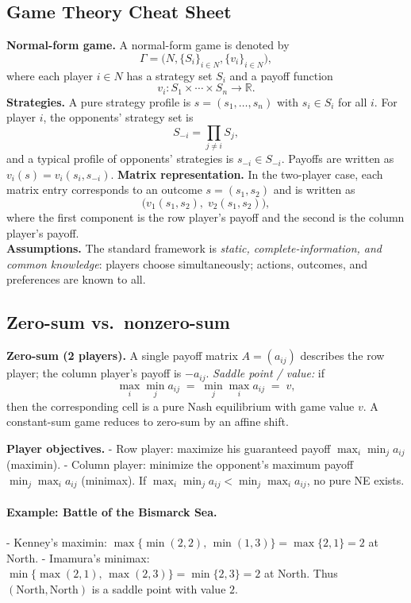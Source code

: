\documentclass[11pt]{article}
\newcommand{\Players}{N}
\begin{document}
\begin{multicols}{2}
\newpage
\section*{Game Theory Cheat Sheet}

\textbf{Normal-form game.} A normal-form game is denoted by
\[
\Gamma = \bigl(\Players, \{S_i\}_{i\in \Players}, \{v_i\}_{i\in \Players}\bigr),
\]
where each player $i\in\Players$ has a strategy set $S_i$ and a payoff function
\[
v_i : S_1 \times \cdots \times S_n \to \mathbb{R}.
\]
\textbf{Strategies.}  
A pure strategy profile is $s=(s_1,\dots,s_n)$ with $s_i \in S_i$ for all $i$.  
For player $i$, the opponents’ strategy set is
\[
S_{-i} = \prod_{j \neq i} S_j,
\]
and a typical profile of opponents’ strategies is $s_{-i}\in S_{-i}$.  
Payoffs are written as $v_i(s) = v_i(s_i,s_{-i})$.
\textbf{Matrix representation.}  
In the two-player case, each matrix entry corresponds to an outcome $s=(s_1,s_2)$ and is written as
\[
\bigl(v_1(s_1,s_2), \; v_2(s_1,s_2)\bigr),
\]
where the first component is the row player’s payoff and the second is the column player’s payoff.\\
\textbf{Assumptions.}  
The standard framework is \emph{static, complete-information, and common knowledge}: players choose simultaneously; actions, outcomes, and preferences are known to all.

\subsection*{Zero-sum vs.\ nonzero-sum}

\textbf{Zero-sum (2 players).}  
A single payoff matrix $A=(a_{ij})$ describes the row player; the column player’s payoff is $-a_{ij}$.  
\emph{Saddle point / value:} if
\[
\max_i \min_j a_{ij} \;=\; \min_j \max_i a_{ij} \;=\; v,
\]
then the corresponding cell is a pure Nash equilibrium with game value $v$.  
A constant-sum game reduces to zero-sum by an affine shift.

\textbf{Player objectives.}  
- Row player: maximize his guaranteed payoff $\max_i \min_j a_{ij}$ (maximin).  
- Column player: minimize the opponent’s maximum payoff $\min_j \max_i a_{ij}$ (minimax).  
If $\max_i \min_j a_{ij} < \min_j \max_i a_{ij}$, no pure NE exists.

\paragraph{Example: Battle of the Bismarck Sea.}
- Kenney’s maximin: $\max\{\min(2,2),\,\min(1,3)\} = \max\{2,1\} = 2$ at North.  
- Imamura’s minimax: $\min\{\max(2,1),\,\max(2,3)\} = \min\{2,3\} = 2$ at North.  Thus $(\text{North},\text{North})$ is a saddle point with value $2$.



\end{multicols}
\end{document}
